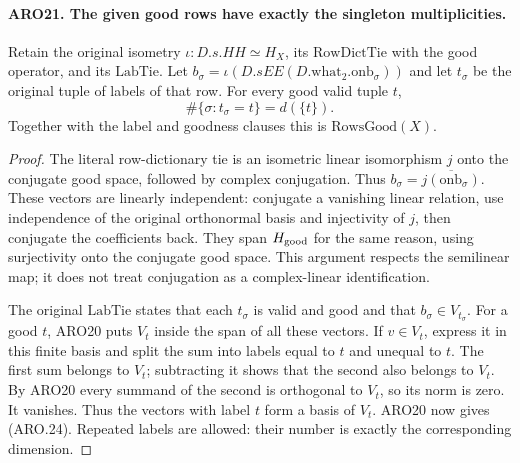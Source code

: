 \paragraph{ARO21. The given good rows have exactly the singleton multiplicities.}
\label{claim:ARO21}
Retain the original isometry
\(\iota:D.s.HH\simeq H_X\), its \(\mathrm{RowDictTie}\) with
the good operator, and its \(\mathrm{LabTie}\).  Let
\(b_\sigma=\iota(D.sEE(D.\mathrm{what}_2.\mathrm{onb}_\sigma))\)
and let \(t_\sigma\) be the original tuple of labels of that row.
For every good valid tuple \(t\),
\[
                   \#\{\sigma:t_\sigma=t\}=d(\{t\}).
 \tag{ARO.24}
\]
Together with the label and goodness clauses this is
\(\mathrm{RowsGood}(X)\).
\begin{proof}
The literal row-dictionary tie is an isometric linear isomorphism
\(j\) onto the conjugate good space, followed by complex
conjugation.  Thus \(b_\sigma=\overline{j(\mathrm{onb}_\sigma)}\).
These vectors are linearly independent: conjugate a vanishing
linear relation, use independence of the original orthonormal
basis and injectivity of \(j\), then conjugate the coefficients
back.  They span \(H_{\rm good}\) for the same reason, using
surjectivity onto the conjugate good space.  This argument respects
the semilinear map; it does not treat conjugation as a complex-linear
identification.

The original \(\mathrm{LabTie}\) states that each \(t_\sigma\)
is valid and good and that \(b_\sigma\in V_{t_\sigma}\).
For a good \(t\), ARO20 puts \(V_t\) inside the span of all these
vectors.  If \(v\in V_t\), express it in this finite basis and
split the sum into labels equal to \(t\) and unequal to \(t\).
The first sum belongs to \(V_t\); subtracting it shows that the
second also belongs to \(V_t\).  By ARO20 every summand of the
second is orthogonal to \(V_t\), so its norm is zero.  It vanishes.
Thus the vectors with label \(t\) form a basis of \(V_t\).
ARO20 now gives (ARO.24).  Repeated labels are allowed: their
number is exactly the corresponding dimension.
\end{proof}

